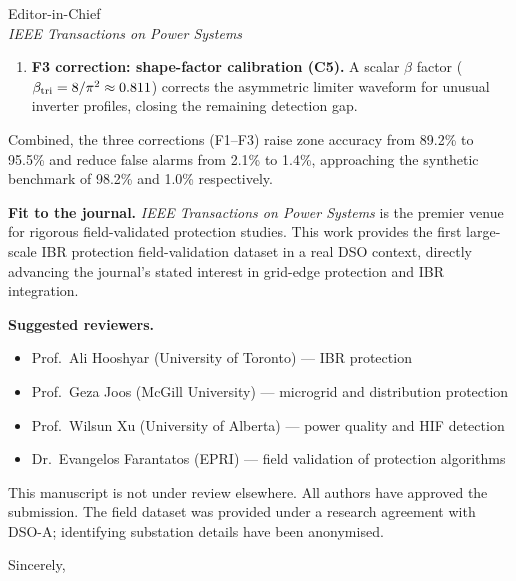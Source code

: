 \documentclass[11pt,a4paper]{letter}
\begin{document}
\begin{letter}{Editor-in-Chief\\
               \textit{IEEE Transactions on Power Systems}}
\begin{enumerate}
  \item \textbf{F3 correction: shape-factor calibration (C5).}  A scalar
        $\beta$ factor ($\beta_{\rm tri} = 8/\pi^2 \approx 0.811$) corrects
        the asymmetric limiter waveform for unusual inverter profiles,
        closing the remaining detection gap.
\end{enumerate}

Combined, the three corrections (F1--F3) raise zone accuracy from 89.2\%
to 95.5\% and reduce false alarms from 2.1\% to 1.4\%, approaching the
synthetic benchmark of 98.2\% and 1.0\% respectively.

\textbf{Fit to the journal.}
\textit{IEEE Transactions on Power Systems} is the premier venue for
rigorous field-validated protection studies.  This work provides the
first large-scale IBR protection field-validation dataset in a real DSO
context, directly advancing the journal's stated interest in
grid-edge protection and IBR integration.

\textbf{Suggested reviewers.}
\begin{itemize}
  \item Prof.\ Ali Hooshyar (University of Toronto) — IBR protection
  \item Prof.\ Geza Joos (McGill University) — microgrid and distribution protection
  \item Prof.\ Wilsun Xu (University of Alberta) — power quality and HIF detection
  \item Dr.\ Evangelos Farantatos (EPRI) — field validation of protection algorithms
\end{itemize}

This manuscript is not under review elsewhere.  All authors have approved
the submission.  The field dataset was provided under a research agreement
with DSO-A; identifying substation details have been anonymised.

\closing{Sincerely,}
\end{letter}
\end{document}
